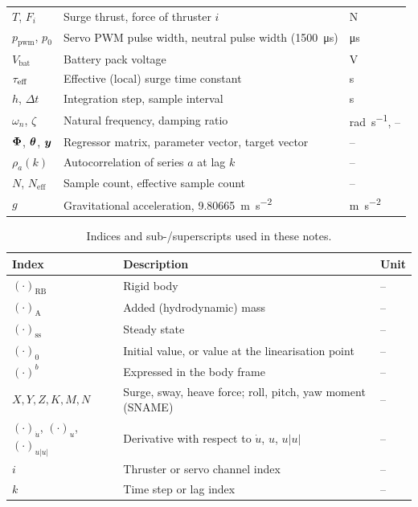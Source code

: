 \begin{table}[htbp]
\begin{tabularx}{\textwidth}{@{}l X l@{}}
$T$, $F_i$ & Surge thrust, force of thruster $i$ & \unit{\newton} \\
$p_\mathrm{pwm}$, $p_0$ & Servo PWM pulse width, neutral pulse width (\qty{1500}{\micro\second}) & \unit{\micro\second} \\
$V_\mathrm{bat}$ & Battery pack voltage & \unit{\volt} \\
$\tau_\mathrm{eff}$ & Effective (local) surge time constant & \unit{\second} \\
$h$, $\Delta t$ & Integration step, sample interval & \unit{\second} \\
$\omega_n$, $\zeta$ & Natural frequency, damping ratio & \unit{\radian\per\second}, -- \\
$\boldsymbol{\Phi}$, $\boldsymbol{\theta}$, $\boldsymbol{y}$ & Regressor matrix, parameter vector, target vector & -- \\
$\rho_a(k)$ & Autocorrelation of series $a$ at lag $k$ & -- \\
$N$, $N_\mathrm{eff}$ & Sample count, effective sample count & -- \\
$g$ & Gravitational acceleration, \qty{9.80665}{\meter\per\second\squared} & \unit{\meter\per\second\squared} \\
\bottomrule
\end{tabularx}
\end{table}

\begin{table}[htbp]
\centering
\caption{Indices and sub-/superscripts used in these notes.}
\label{tab:nom-indices}
\small
\begin{tabularx}{\textwidth}{@{}l X l@{}}
\toprule
Index & Description & Unit \\
\midrule
$(\cdot)_\mathrm{RB}$ & Rigid body & -- \\
$(\cdot)_\mathrm{A}$ & Added (hydrodynamic) mass & -- \\
$(\cdot)_\mathrm{ss}$ & Steady state & -- \\
$(\cdot)_0$ & Initial value, or value at the linearisation point & -- \\
$(\cdot)^b$ & Expressed in the body frame & -- \\
$X, Y, Z, K, M, N$ & Surge, sway, heave force; roll, pitch, yaw moment (SNAME) & -- \\
$(\cdot)_{\dot u}$, $(\cdot)_u$, $(\cdot)_{u|u|}$ & Derivative with respect to $\dot u$, $u$, $u|u|$ & -- \\
$i$ & Thruster or servo channel index & -- \\
$k$ & Time step or lag index & -- \\
\bottomrule
\end{tabularx}
\end{table}

